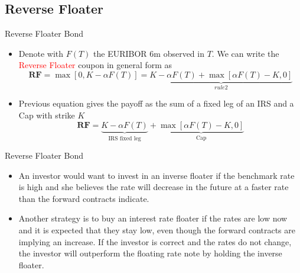 \documentclass{beamer}
\begin{document}
\subsection{Reverse Floater}
\begin{frame}{Reverse Floater Bond}
\begin{itemize}
	\item Denote with $F(T)$ the EURIBOR 6m observed in $T$. We can write the \textcolor{red}{Reverse Floater} coupon in general form as
	\begin{equation*}
		\textbf{RF}=\max[0, K-\alpha F(T)] = \underbrace{K-\alpha F(T) + \max[\alpha F(T)-K,0]}_{rule 2}
	\end{equation*}
	\item Previous equation gives the payoff as the sum of a fixed leg of an IRS and a Cap with strike $K$
\begin{equation*}
	\textbf{RF} = \underbrace{K - \alpha F(T)}_{\text{IRS fixed leg}} + \underbrace{\max[\alpha F(T)-K,0]}_{\text{Cap}}
\end{equation*}

\end{itemize}
\end{frame}

\begin{frame}{Reverse Floater Bond}
	\begin{itemize}
		\item An investor would want to invest in an inverse floater if the benchmark rate is high and she believes the rate will decrease in the future at a faster rate than the forward contracts indicate. 
		\item Another strategy is to buy an interest rate floater if the rates are low now and it is expected that they stay low, even though the forward contracts are implying an increase. If the investor is correct and the rates do not change, the investor will outperform the floating rate note by holding the inverse floater.
	\end{itemize}
\end{frame}
\end{document}
